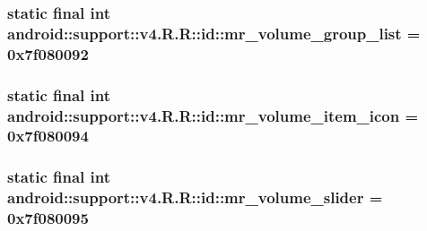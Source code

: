 \hypertarget{classandroid_1_1support_1_1v4_1_1_r_1_1id_ee5002c282734210594308ca60a87649}{
\subsubsection[{mr\_\-volume\_\-group\_\-list}]{\setlength{\rightskip}{0pt plus 5cm}static final int android::support::v4.R.R::id::mr\_\-volume\_\-group\_\-list = 0x7f080092}}
\label{classandroid_1_1support_1_1v4_1_1_r_1_1id_ee5002c282734210594308ca60a87649}


\hypertarget{classandroid_1_1support_1_1v4_1_1_r_1_1id_f6a6c86526d7c5f4ed2afb91899f57c5}{
\subsubsection[{mr\_\-volume\_\-item\_\-icon}]{\setlength{\rightskip}{0pt plus 5cm}static final int android::support::v4.R.R::id::mr\_\-volume\_\-item\_\-icon = 0x7f080094}}
\label{classandroid_1_1support_1_1v4_1_1_r_1_1id_f6a6c86526d7c5f4ed2afb91899f57c5}


\hypertarget{classandroid_1_1support_1_1v4_1_1_r_1_1id_4eff820587dce947ac8ef57798bbe065}{
\subsubsection[{mr\_\-volume\_\-slider}]{\setlength{\rightskip}{0pt plus 5cm}static final int android::support::v4.R.R::id::mr\_\-volume\_\-slider = 0x7f080095}}
\label{classandroid_1_1support_1_1v4_1_1_r_1_1id_4eff820587dce947ac8ef57798bbe065}


